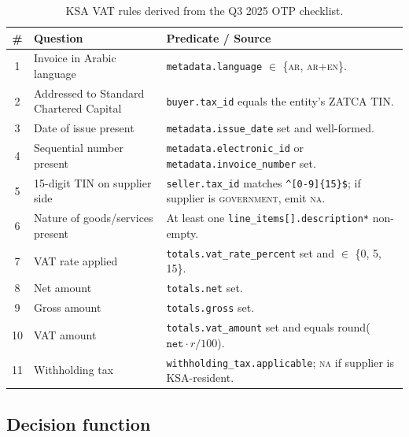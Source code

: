 \documentclass[11pt,a4paper,twoside]{report}
\begin{document}
\begin{table}[htbp]
\centering
\caption{KSA VAT rules derived from the Q3 2025 OTP checklist.}
\label{tab:ksa-rules}
\footnotesize
\begin{tabularx}{\linewidth}{@{}c l X@{}}
\toprule
\textbf{\#} & \textbf{Question} & \textbf{Predicate / Source} \\ \midrule
1  & Invoice in Arabic language
   & \texttt{metadata.language} $\in$ \{\textsc{ar}, \textsc{ar+en}\}. \\
2  & Addressed to Standard Chartered Capital
   & \texttt{buyer.tax\_id} equals the entity's ZATCA TIN. \\
3  & Date of issue present
   & \texttt{metadata.issue\_date} set and well-formed. \\
4  & Sequential number present
   & \texttt{metadata.electronic\_id} or \texttt{metadata.invoice\_number} set. \\
5  & 15-digit TIN on supplier side
   & \texttt{seller.tax\_id} matches \verb|^[0-9]{15}$|; if supplier is \textsc{government}, emit \textsc{na}. \\
6  & Nature of goods/services present
   & At least one \texttt{line\_items[].description*} non-empty. \\
7  & VAT rate applied
   & \texttt{totals.vat\_rate\_percent} set and $\in$ \{0, 5, 15\}. \\
8  & Net amount
   & \texttt{totals.net} set. \\
9  & Gross amount
   & \texttt{totals.gross} set. \\
10 & VAT amount
   & \texttt{totals.vat\_amount} set and equals round($\texttt{net} \cdot r / 100$). \\
11 & Withholding tax
   & \texttt{withholding\_tax.applicable}; \textsc{na} if supplier is KSA-resident. \\
\bottomrule
\end{tabularx}
\end{table}

\subsection{Decision function}
\end{document}
